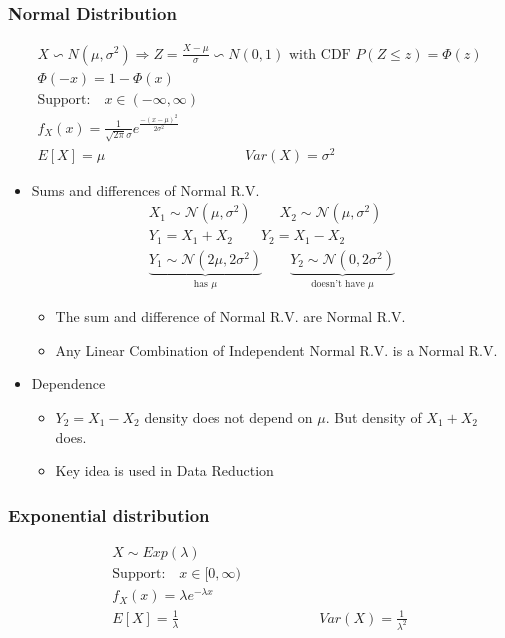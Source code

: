 \subsubsection*{Normal Distribution}
\begin{tcolorbox}
	\begin{gather*}
	X \backsim N(\mu, \sigma^2) \Rightarrow Z = \frac{X- \mu}{\sigma} \backsim N(0,1) \text{ with CDF } P(Z \leq z) = \Phi(z)\\
	\Phi(-x) = 1 - \Phi(x) \\
	\text{Support:} \quad x \in (-\infty, \infty)\\
	f_X(x) = \frac{1}{\sqrt{2\pi} \sigma}e^{\frac{-(x - \mu)^2}{2\sigma^2}}\\
	E[X] = \mu \hspace{10em} Var(X) = \sigma^2
\end{gather*}
\end{tcolorbox}
\begin{itemize}
	\item Sums and differences of Normal R.V.
	\begin{gather*}
		X_1 \sim \mathcal{N}(\mu, \sigma^2) \qquad X_2 \sim \mathcal{N}(\mu, \sigma^2)\\
		Y_1 = X_1 + X_2 \qquad Y_2 = X_1 - X_2\\
		\underbrace{Y_1 \sim \mathcal{N}(2\mu, 2\sigma^2)}_{\text{has } \mu} \qquad \underbrace{Y_2 \sim \mathcal{N}(0, 2\sigma^2)}_{\text{doesn't have } \mu}
	\end{gather*}
	\begin{itemize}[label={--}]
		\item The sum and difference of Normal R.V. are Normal R.V.
		\item Any Linear Combination of Independent Normal R.V. is a Normal R.V.
	\end{itemize}
	\item Dependence
	\begin{itemize}[label={--}]
		\item $Y_2 = X_1 - X_2$ density does not depend on $\mu$. But density of $X_1 + X_2$ does.
		\item Key idea is used in Data Reduction
	\end{itemize}
\end{itemize}
\subsubsection*{Exponential distribution}
\begin{tcolorbox}
\begin{gather*}
	X \sim Exp(\lambda)\\
	\text{Support:} \quad x \in [0, \infty)\\
	f_X(x) = \lambda e^{-\lambda x}\\
	E[X] = \frac{1}{\lambda} \hspace{10em} Var(X) = \frac{1}{\lambda^2}
\end{gather*}	
\end{tcolorbox}

